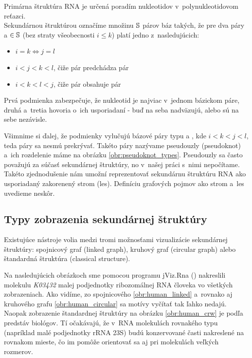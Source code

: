 \begin{definice}
  \label{def:RNA_sekundarna_struktura}
  Primárna štruktúra RNA je určená poradím nukleotidov v~polynukleotidovom reťazci.
  \\
  Sekundárnou štruktúrou označíme množinu $\mathbb{S}$ párov báz  takých,
  že pre dva páry  a  $\in \mathbb{S}$ (bez straty všeobecnosti $i \leq k$)
  platí jedno z~nasledujúcich:
  \begin{itemize}
    \item $i = k \iff j = l$
    \item $i < j < k < l$, čiže pár  predchádza pár 
    \item $i < k < l < j$, čiže pár  obsahuje pár 
  \end{itemize}
\end{definice}

Prvá podmienka zabezpečuje, že nukleotid je najviac v~jednom bázickom páre,
druhá a~tretia hovoria o~ich usporiadaní - buď na seba nadväzujú, alebo
sú na sebe nezávisle.

Všimnime si ďalej, že podmienky vylučujú bázové páry typu  a ,
kde \mbox{$i < k < j < l$}, teda páry sa nesmú prekrývať. Takéto páry nazývame
pseudouzly (pseudoknot) a~ich rozdelenie máme na obrázku \ref{obr:pseudoknot_types}.
Pseudouzly sa často považujú za súčasť sekundárnej štruktúry, no v~našej práci
s~nimi nepočítame. Takéto zjednodušenie nám umožní reprezentovať sekundárnu
štruktúru RNA ako usporiadaný zakorenený strom (les). Definíciu grafových
pojmov ako strom a~les uvedieme neskôr.





\subsection{Typy zobrazenia sekundárnej štruktúry}

Existujúce nástroje volia medzi tromi možnosťami vizualizácie sekundárnej
štruktúry: spojnicový graf (linked graph), kruhový graf (circular graph)
alebo štandardná štruktúra (classical structure).

Na nasledujúcich obrázkoch sme pomocou programu jViz.Rna (\citet{JVIZ})
nakreslili molekulu \textit{K03432} malej podjednotky ribozomálnej RNA človeka
vo všetkých zobrazeniach.
Ako vidíme, zo spojnicového \ref{obr:human_linked} a~rovnako aj kruhového
grafu \ref{obr:human_circular} sa motívy vyčítať tak ľahko nedajú.
Naopak zobrazenie štandardnej štruktúry na obrázku \ref{obr:human_crw}
je podľa predstáv biológov.
Tí očakávajú, že v~RNA molekulách rovnakého typu (napríklad malé podjednotky rRNA 23S)
budú konzervované časti nakreslené na rovnakom mieste, čo im pomôže orientovať sa
aj pri molekulách veľkých rozmerov.


